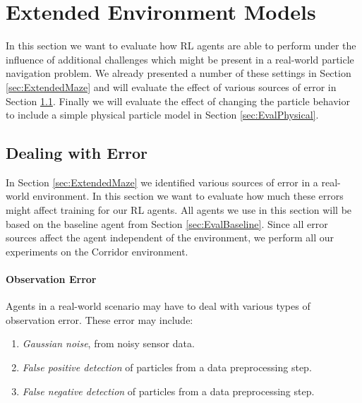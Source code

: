 \newpage
\section{Extended Environment Models} \label{sec:EvalExtendedModels}
In this section we want to evaluate how RL agents are able to perform under the influence of additional challenges which might be present in a real-world particle navigation problem. We already presented a number of these settings in Section \ref{sec:ExtendedMaze} and will evaluate the effect of various sources of error in Section \ref{sec:EvalError}. Finally we will evaluate the effect of changing the particle behavior to include a simple physical particle model in Section \ref{sec:EvalPhysical}.

\subsection{Dealing with Error} \label{sec:EvalError}
In Section \ref{sec:ExtendedMaze} we identified various sources of error in a real-world environment. In this section we want to evaluate how much these errors might affect training for our RL agents. All agents we use in this section will be based on the baseline agent from Section \ref{sec:EvalBaseline}. Since all error sources affect the agent independent of the environment, we perform all our experiments on the Corridor environment.

\paragraph{Observation Error}
Agents in a real-world scenario may have to deal with various types of observation error. These error may include:
\begin{enumerate}
    \item \textit{Gaussian noise}, from noisy sensor data.
    \item \textit{False positive detection} of particles from a data preprocessing step.
    \item \textit{False negative detection} of particles from a data preprocessing step.
\end{enumerate}


